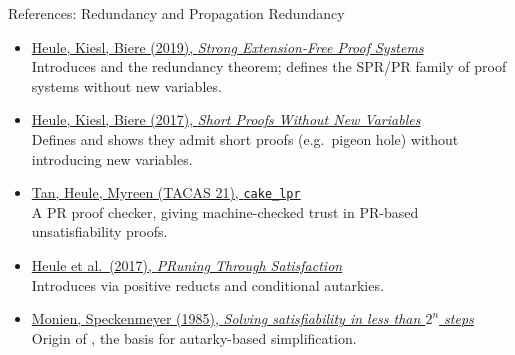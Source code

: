 \documentclass[t]{sdqbeamer}
\begin{document}
\begin{frame}{References: Redundancy and Propagation Redundancy}
\begin{itemize}\setlength{\itemsep}{1.2em}
    \item \href{https://doi.org/10.1007/s10817-019-09516-0}{Heule, Kiesl, Biere (2019), \emph{Strong Extension-Free Proof Systems}}\\[2pt]
    Introduces  and the redundancy theorem; defines the SPR/PR family of proof systems without new variables.
    \item \href{https://doi.org/10.1007/978-3-319-63046-5_9}{Heule, Kiesl, Biere (2017), \emph{Short Proofs Without New Variables}}\\[2pt]
    Defines  and shows they admit short proofs (e.g.\ pigeon hole) without introducing new variables.
    \item \href{https://cakeml.org/tacas21.pdf}{Tan, Heule, Myreen (TACAS 21), \texttt{cake\_lpr}}\\[2pt]
    A  PR proof checker, giving machine-checked trust in PR-based unsatisfiability proofs.
    \item \href{https://doi.org/10.1007/978-3-319-70389-3_12}{Heule et al.\ (2017), \emph{PRuning Through Satisfaction}}\\[2pt]
    Introduces  via positive reducts and conditional autarkies.
    \item \href{https://doi.org/10.1016/0166-218X(85)90050-2}{Monien, Speckenmeyer (1985), \emph{Solving satisfiability in less than $2^n$ steps}}\\[2pt]
    Origin of , the basis for autarky-based simplification.
\end{itemize}
\end{frame}
\end{document}
